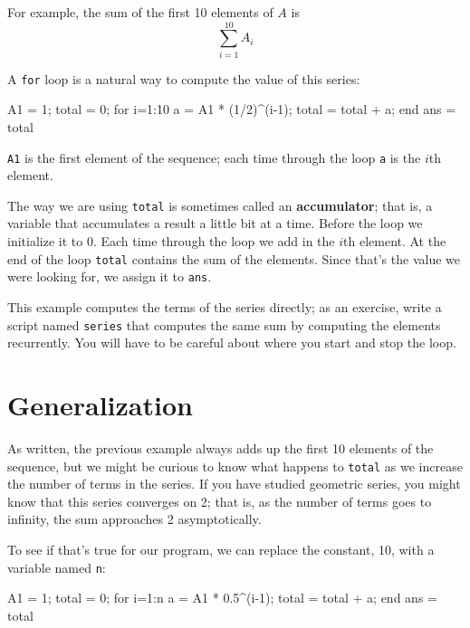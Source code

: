 \documentclass[main.tex]{subfiles}
\begin{document}

For example, the sum of the first 10 elements of $A$ is
\begin{equation}
\sum_{i=1}^{10} A_i
\end{equation}

A {\tt for} loop is a natural way to compute the value of this
series:

\begin{code}
A1 = 1;
total = 0;
for i=1:10
    a = A1 * (1/2)^(i-1);
    total = total + a;
end
ans = total
\end{code}

{\tt A1} is the first element of the sequence; each time
through the loop {\tt a} is the $i$th element.


The way we are using {\tt total} is sometimes called an {\bf
accumulator}; that is, a variable that accumulates a result a little
bit at a time.  
Before the loop we initialize it to 0.  
Each time
through the loop we add in the $i$th element.  
At the end of the loop
{\tt total} contains the sum of the elements.  
Since that's the value
we were looking for, we assign it to {\tt ans}.

\begin{ex}
This example computes the terms of the series directly; as
an exercise, write a script named {\tt series} that computes
the same sum by computing the elements recurrently.  You will
have to be careful about where you start and stop the loop.
\end{ex}


\section{Generalization}


As written, the previous example always adds up the first 10
elements of the sequence, but we might be curious to know what
happens to {\tt total} as we increase the
number of terms in the series.  If you have studied geometric
series, you might know that this series converges on 2; that is,
as the number of terms goes to infinity, the sum approaches
2 asymptotically.

To see if that's true for our program, we can replace the
constant, 10, with a variable named {\tt n}:

\begin{code}
A1 = 1;
total = 0;
for i=1:n
    a = A1 * 0.5^(i-1);
    total = total + a;
end
ans = total
\end{code}
\end{document}
